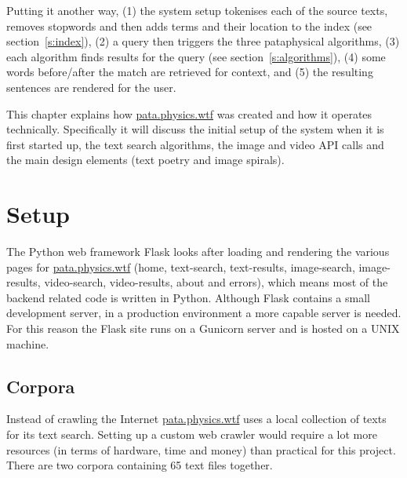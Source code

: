   

Putting it another way, (1) the system setup tokenises each of the source texts, removes stopwords and then adds terms and their location to the index (see section~\ref{s:index}), (2) a query then triggers the three pataphysical algorithms, (3) each algorithm finds results for the query (see section~\ref{s:algorithms}), (4) some words before/after the match are retrieved for context, and (5) the resulting sentences are rendered for the user.

\spirals

This chapter explains how \url{pata.physics.wtf} was created and how it operates technically. Specifically it will discuss the initial setup of the system when it is first started up, the text search algorithms, the image and video \ac{API} calls and the main design elements (text poetry and image spirals).


\section{Setup}
\label{s:setup}

The Python web framework Flask \autocite{Ronacher2016} looks after loading and rendering the various pages for \url{pata.physics.wtf} (home, text-search, text-results, image-search, image-results, video-search, video-results, about and errors), which means most of the backend related code is written in Python. Although Flask contains a small development server, in a production environment a more capable server is needed. For this reason the Flask site runs on a Gunicorn server \autocite{Gunicorn2016} and is hosted on a UNIX machine.


\subsection{Corpora}
\label{s:corpora}

Instead of crawling the Internet \url{pata.physics.wtf} uses a local collection of texts for its text search. Setting up a custom web crawler would require a lot more resources (in terms of hardware, time and money) than practical for this project. There are two corpora containing \num{65} text files together. 

